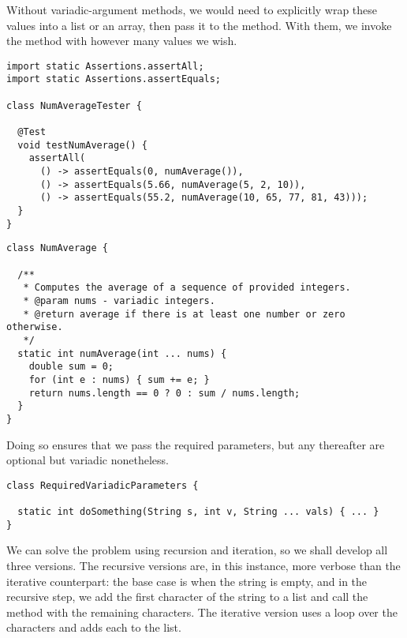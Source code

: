 Without variadic-argument methods, we would need to explicitly wrap these values into a list or an array, then pass it to the method. 
With them, we invoke the method with however many values we wish.

\begin{lstlisting}[language=MyJava]
import static Assertions.assertAll;
import static Assertions.assertEquals;

class NumAverageTester {

  @Test
  void testNumAverage() {
    assertAll(
      () -> assertEquals(0, numAverage()),
      () -> assertEquals(5.66, numAverage(5, 2, 10)),
      () -> assertEquals(55.2, numAverage(10, 65, 77, 81, 43)));
  }
}
\end{lstlisting}

\begin{lstlisting}[language=MyJava]
class NumAverage {

  /**
   * Computes the average of a sequence of provided integers.
   * @param nums - variadic integers.
   * @return average if there is at least one number or zero otherwise.
   */
  static int numAverage(int ... nums) {
    double sum = 0;
    for (int e : nums) { sum += e; }
    return nums.length == 0 ? 0 : sum / nums.length;
  }
}
\end{lstlisting}

Doing so ensures that we pass the required parameters, but any thereafter are optional but variadic nonetheless.

\begin{lstlisting}[language=MyJava]
class RequiredVariadicParameters {

  static int doSomething(String s, int v, String ... vals) { ... }
}
\end{lstlisting}

We can solve the problem using recursion and iteration, so we shall develop all three versions.
The recursive versions are, in this instance, more verbose than the iterative counterpart: the base case is when the string is empty, and in the recursive step, we add the first character of the string to a list and call the method with the remaining characters.
The iterative version uses a loop over the characters and adds each to the list.

